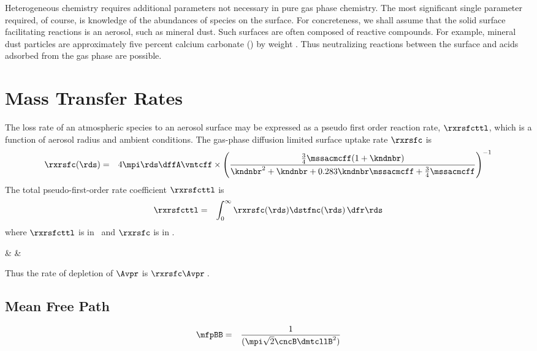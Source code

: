 \documentclass[12pt,twoside]{book}
\newcounter{reaction} %
\begin{document}
Heterogeneous chemistry requires additional parameters not necessary in
pure gas phase chemistry.
The most significant single parameter required, of course, is
knowledge of the abundances of species on the surface. 
For concreteness, we shall assume that the solid surface facilitating
reactions is an aerosol, such as mineral dust.
Such surfaces are often composed of reactive compounds.
For example, mineral dust particles are approximately five percent
calcium carbonate (\CaCOt) by weight \cite[]{Pye87}.
Thus neutralizing reactions between the surface and acids adsorbed
from the gas phase are possible.

\section[Mass Transfer Rates]{Mass Transfer Rates}
The loss rate of an atmospheric species to an aerosol surface may be
expressed as a pseudo first order reaction rate, $\rxrsfcttl$, which
is a function of aerosol radius and ambient conditions.
The gas-phase diffusion limited surface uptake rate $\rxrsfc$ is
\begin{eqnarray}
\rxrsfc (\rds) & = & 4 \mpi \rds \dffA \vntcff \times
\left(
\frac{\frac{3}{4} \mssacmcff ( 1 + \kndnbr ) }{
\kndnbr^{2} + \kndnbr + 0.283 \kndnbr \mssacmcff + \frac{3}{4} \mssacmcff }
\right)^{-1}
\label{rxn:rxr_sfc_dfn}
\end{eqnarray}
The total pseudo-first-order rate coefficient $\rxrsfcttl$ is
\begin{eqnarray}
\rxrsfcttl & = & \int_{0}^{\infty} \rxrsfc( \rds ) \dstfnc ( \rds ) \,\dfr\rds
\label{rxn:rxr_sfc_ttl_dfn}
\end{eqnarray}
where $\rxrsfcttl$ is in \xs\ and $\rxrsfc$ is in \mCxs.
\begin{rxnarray}
\Avpr & \eqbm & \Asld %
\end{rxnarray}
Thus the rate of depletion of $\Avpr$ is $\rxrsfc \Avpr$\,\mlcxs. 

\subsection[Mean Free Path]{Mean Free Path}\label{sxn:mfp}
\begin{eqnarray}
\mfpBB & = & \frac{1}{( \mpi \sqrt{2} \cncB \dmtcllB^{2} ) }
\label{eqn:mfp_BB_dfn}
\end{eqnarray}
\end{document}

